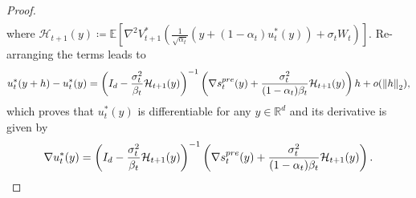 \documentclass[10pt,a4paper]{amsart}
\newcommand{\R}{\mathbb{R}}
\newcommand{\bracket}[1]{\left[ #1 \right]}
\newcommand{\parenthesis}[1]{\left( #1 \right)}
\newcommand{\mcal}[1]{\mathcal{#1}}
\newcommand{\norm}[1]{\left \|#1\right \|}
\newcommand{\E}{\mathbb{E}}
\begin{document}
\begin{proof}
\begin{align*}
\end{align*}
where $\mcal{H}_{t+1}(y) \coloneqq \E\bracket{\nabla^2 V_{t+1}^{*}\left(\frac{1}{\sqrt{\alpha_t}}\parenthesis{y + (1 - \alpha_t)u_t^*(y)} + \sigma_t W_t\right)}  $.
Re-arranging the terms leads to
\begin{align*}
    u_t^*(y+h) - u_t^*(y) = \parenthesis{I_d - \frac{\sigma_t^2}{\beta_t}\mcal{H}_{t+1}(y)}^{-1}\parenthesis{\nabla s_t^{\rm pre}(y) + \frac{\sigma_t^2}{(1 - \alpha_t)\beta_t}\mcal{H}_{t+1}(y)}h + o(\norm{h}_2),
\end{align*}
which proves that $u_t^*(y)$ is differentiable for any $y\in \R^d$ and its derivative is given by 
\begin{align}\label{eq:grad u*-re}
    \nabla u_t^*(y) = \parenthesis{I_d - \frac{\sigma_t^2}{\beta_t}\mcal{H}_{t+1}(y)}^{-1}\parenthesis{\nabla s_t^{\rm pre}(y) + \frac{\sigma_t^2}{(1 - \alpha_t)\beta_t}\mcal{H}_{t+1}(y)}.
\end{align}


\end{proof}
\end{document}
